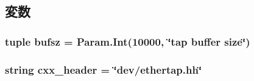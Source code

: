 \subsection{変数}
\hypertarget{classEthernet_1_1EtherTap_ab5be077942ce51d482768cedd305ebc8}{
\subsubsection[{bufsz}]{\setlength{\rightskip}{0pt plus 5cm}tuple {\bf bufsz} = Param.Int(10000, \char`\"{}tap buffer size\char`\"{})}}
\label{classEthernet_1_1EtherTap_ab5be077942ce51d482768cedd305ebc8}
\hypertarget{classEthernet_1_1EtherTap_a17da7064bc5c518791f0c891eff05fda}{
\subsubsection[{cxx\_\-header}]{\setlength{\rightskip}{0pt plus 5cm}string {\bf cxx\_\-header} = \char`\"{}dev/ethertap.hh\char`\"{}}}
\label{classEthernet_1_1EtherTap_a17da7064bc5c518791f0c891eff05fda}


